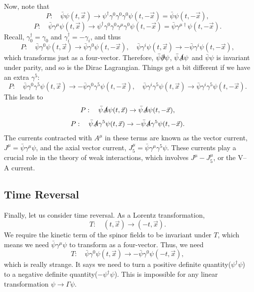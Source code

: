 \documentclass[11pt]{article}
\theoremstyle{definition}
\begin{document}
Now, note that
\begin{equation}
    P: \quad \bar{\psi}\psi(t,\vec{x}) \to \psi^\dagger\gamma^0\gamma^0\gamma^0\psi(t,-\vec{x}) = \bar{\psi}\psi(t,-\vec{x}),
\end{equation}
\begin{equation}
    P: \quad \bar{\psi}\gamma^\mu\psi(t,\vec{x}) \to \psi^\dagger\gamma^0\gamma^0\gamma^\mu\gamma^0\psi(t,-\vec{x}) = \bar{\psi}\gamma^{\mu\dagger}\psi(t,-\vec{x}).
\end{equation}
Recall, $\gamma_0^\dagger= \gamma_0$ and $\gamma_i^\dagger= -\gamma_i$, and thus
\begin{equation}
    P: \quad \bar{\psi}\gamma^0\psi(t,\vec{x}) \to \bar{\psi}\gamma^0\psi(t,-\vec{x}), \quad \bar{\psi}\gamma^i\psi(t,\vec{x}) \to -\bar{\psi}\gamma^i\psi(t,-\vec{x}),
\end{equation}
which transforms just as a four-vector. Therefore, $\bar{\psi}\slashed{\partial}\psi$, $\bar{\psi}\slashed{A}\psi$ and $\bar{\psi}\psi$ is invariant under parity, and so is the Dirac Lagrangian. Things get a bit different if we have an extra $\gamma^5$:
\begin{equation}
    P: \quad \bar{\psi}\gamma^0\gamma^5\psi(t,\vec{x}) \to -\bar{\psi}\gamma^0\gamma^5\psi(t,-\vec{x}), \quad \bar{\psi}\gamma^i\gamma^5\psi(t,\vec{x}) \to \bar{\psi}\gamma^i\gamma^5\psi(t,-\vec{x}).
\end{equation}
This leads to
\begin{equation}
    P: \quad \bar{\psi}\slashed{A}\psi(t,\vec{x}) \to \bar{\psi}\slashed{A}\psi(t,-\vec{x}),
\end{equation}
\begin{equation}
    P: \quad \bar{\psi}\slashed{A}\gamma^5\psi(t,\vec{x}) \to -\bar{\psi}\slashed{A}\gamma^5\psi(t,-\vec{x}).
\end{equation}
The currents contracted with \( A^\mu \) in these terms are known as the vector current, \( J^\mu = \bar{\psi} \gamma^\mu \psi \), and the axial vector current, \( J_5^\mu = \bar{\psi} \gamma^\mu \gamma^5 \psi \). These currents play a crucial role in the theory of weak interactions, which involves \( J^\mu - J_5^\mu \), or the V--A current.

\subsection{Time Reversal}
Finally, let us consider time reversal. As a Lorentz transformation,
\begin{equation}
    T: \quad (t,\vec{x}) \to (-t,\vec{x}).
\end{equation}
We require the kinetic term of the spinor fields to be invariant under $T$, which means we need $\bar{\psi}\gamma^\mu\psi$ to transform as a four-vector. Thus, we need
\begin{equation}
    T: \quad \bar{\psi}\gamma^0\psi(t,\vec{x}) \to -\bar{\psi}\gamma^0\psi(-t,\vec{x}),
\end{equation}
which is really strange. It says we need to turn a positive definite quantity($\psi^\dagger\psi$) to a negative definite quantity($-\psi^\dagger\psi$). This is impossible for any linear transformation $\psi \to \Gamma\psi$.
\end{document}
